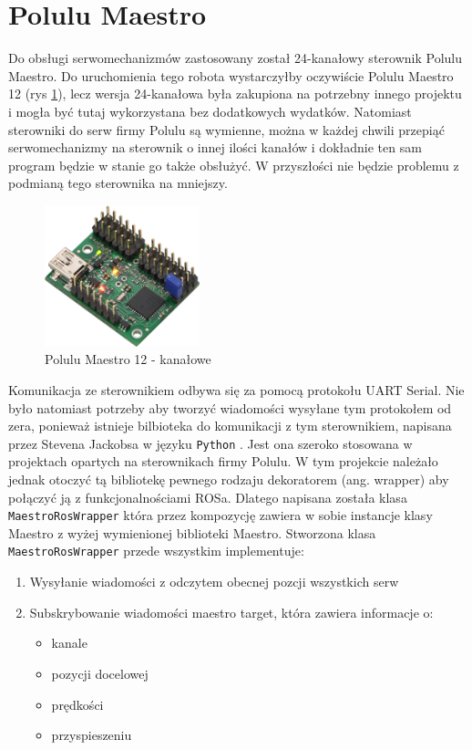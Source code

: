 \section{Polulu Maestro}
Do obsługi serwomechanizmów zastosowany został 24-kanałowy sterownik Polulu Maestro. Do uruchomienia tego robota wystarczyłby oczywiście Polulu Maestro 12 (rys \ref{img:maestro}), lecz wersja 24-kanałowa była zakupiona na potrzebny innego projektu i mogła być tutaj wykorzystana bez dodatkowych wydatków. Natomiast sterowniki do serw firmy Polulu są wymienne, można w każdej chwili przepiąć serwomechanizmy na sterownik o innej ilości kanałów i dokładnie ten sam program będzie w stanie go także obsłużyć. W przyszłości nie będzie problemu z podmianą tego sterownika na mniejszy.\\

\begin{figure}[h!]
\includegraphics[width=0.4\textwidth]{img/maestro.jpg}
\centering
\caption{Polulu Maestro 12 - kanałowe \cite{maestro_shop}}
\label{img:maestro}
\end{figure}

Komunikacja ze sterownikiem odbywa się za pomocą protokołu UART Serial. Nie było natomiast potrzeby aby tworzyć wiadomości wysyłane tym protokołem od zera, ponieważ istnieje bilbioteka do komunikacji z tym sterownikiem, napisana przez Stevena Jackobsa w języku \texttt{Python} \cite{maestro_pylib}. Jest ona szeroko stosowana w projektach opartych na sterownikach firmy Polulu. W tym projekcie należało jednak otoczyć tą bibliotekę pewnego rodzaju dekoratorem (ang. wrapper) aby połączyć ją z funkcjonalnościami ROSa. Dlatego napisana została klasa \texttt{MaestroRosWrapper} która przez kompozycję zawiera w sobie instancje klasy Maestro z wyżej wymienionej biblioteki Maestro. Stworzona klasa \texttt{MaestroRosWrapper} przede wszystkim implementuje:
\begin{enumerate}[noitemsep]
\item Wysyłanie wiadomości z odczytem obecnej pozcji wszystkich serw
\item Subskrybowanie wiadomości maestro target, która zawiera informacje o:
\begin{itemize}[noitemsep]
\item kanale 
\item pozycji docelowej
\item prędkości
\item przyspieszeniu
\end{itemize}
\end{enumerate}

